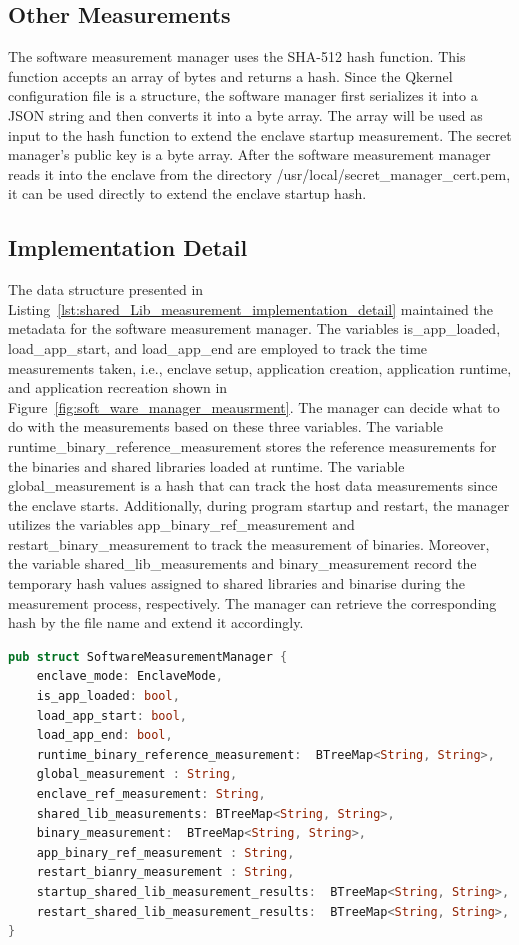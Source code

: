 \subsection{Other Measurements}
The software measurement manager uses the SHA-512 hash function. This function accepts an array of bytes and returns a hash. Since the Qkernel configuration file is a structure, the software manager first serializes it into a JSON string and then converts it into a byte array. The array will 
be used as input to the hash function to extend the enclave startup measurement. The secret manager's public key is a byte array. After the software measurement manager reads it into the enclave from the directory /usr/local/secret\_manager\_cert.pem, it can be used directly to extend the enclave 
startup hash.

\subsection{Implementation Detail}
The data structure presented in Listing~\ref{lst:shared_Lib_measurement_implementation_detail} maintained the metadata for the software measurement manager. The variables is\_app\_loaded, load\_app\_start, and load\_app\_end are employed to track the time measurements taken, i.e., enclave setup, application creation, application runtime, and application 
recreation shown in Figure~\ref{fig:soft_ware_manager_meausrment}. The manager can decide what to do with the measurements based on these three variables. The variable runtime\_binary\_reference\_measurement stores the reference measurements for the binaries and shared libraries loaded at runtime. The variable global\_measurement is a hash that can track the host data measurements since 
the enclave starts. Additionally, during program startup and restart, the manager utilizes the variables app\_binary\_ref\_measurement and restart\_binary\_measurement to track the measurement of binaries. 
Moreover, the variable shared\_lib\_measurements and binary\_measurement record the temporary hash values assigned to shared libraries and binarise during the measurement process, respectively. The manager can retrieve the corresponding hash by the file name and extend it accordingly.


\begin{lstlisting}[language=rust, caption= Interface for accessing the file type secrets, label={lst:shared_Lib_measurement_implementation_detail}]
pub struct SoftwareMeasurementManager {
    enclave_mode: EnclaveMode,
    is_app_loaded: bool,
    load_app_start: bool,
    load_app_end: bool,
    runtime_binary_reference_measurement:  BTreeMap<String, String>,
    global_measurement : String,
    enclave_ref_measurement: String,
    shared_lib_measurements: BTreeMap<String, String>,
    binary_measurement:  BTreeMap<String, String>,
    app_binary_ref_measurement : String,
    restart_bianry_measurement : String,
    startup_shared_lib_measurement_results:  BTreeMap<String, String>,
    restart_shared_lib_measurement_results:  BTreeMap<String, String>,
}
\end{lstlisting}

